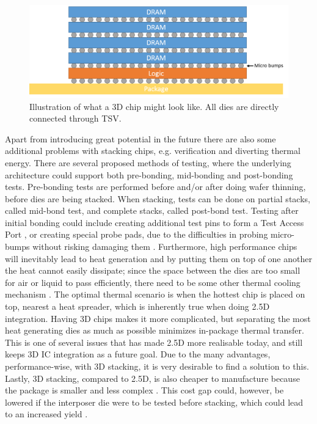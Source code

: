 \begin{figure}[!h]
\centering
\includegraphics[width=0.75\linewidth]{figure/3D-integration.png}
\caption{Illustration of what a 3D chip might look like. All dies are directly connected through TSV.}
\label{3D-chip}
\end{figure}

Apart from introducing great potential in the future there are also some additional problems with stacking chips, e.g. verification and diverting thermal energy. There are several proposed methods of testing, where the underlying architecture could support both pre-bonding, mid-bonding and post-bonding tests. Pre-bonding tests are performed before and/or after doing wafer thinning, before dies are being stacked. When stacking, tests can be done on partial stacks, called mid-bond test, and complete stacks, called post-bond test. Testing after initial bonding could include creating additional test pins to form a Test Access Port \cite{Marinissen:2012:CES:2492708.2493023}, or creating special probe pads, due to the difficulties in probing micro-bumps without risking damaging them \cite{5751450}. Furthermore, high performance chips will inevitably lead to heat generation and by putting them  on top of one another the heat cannot easily dissipate; since the space between the dies are too small for air or liquid to pass efficiently, there need to be some other thermal cooling mechanism \cite{5501261}. The optimal thermal scenario is when the hottest chip is placed on top, nearest a heat spreader, which is inherently true when doing 2.5D integration. Having 3D chips makes it more complicated, but separating the most heat generating dies as much as possible minimizes in-package thermal transfer. This is one of several issues that has made 2.5D more realisable today, and still keeps 3D IC integration as a future goal. Due to the many advantages, performance-wise, with 3D stacking, it is very desirable to find a solution to this. Lastly, 3D stacking, compared to 2.5D, is also cheaper to manufacture because the package is smaller and less complex \cite{6263032}. This cost gap could, however, be lowered if the interposer die were to be tested before stacking, which could lead to an increased yield \cite{6542130}.
\bigskip

